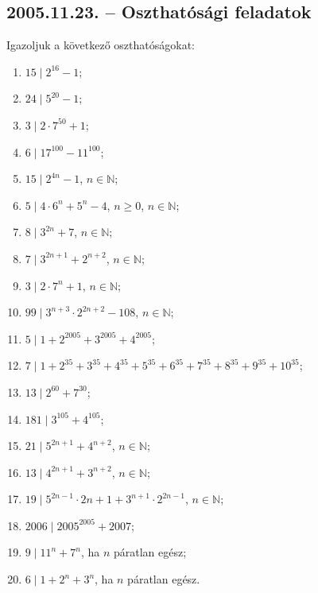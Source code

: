 \subsection*{2005.11.23. -- Oszthatósági feladatok}
Igazoljuk a következő oszthatóságokat:

\begin{enumerate}
 
\item $15 \mid 2^{16}-1$;

\item $24 \mid 5^{20}-1$;

\item $3 \mid 2 \cdot 7^{50}+1$;

\item $6 \mid 17^{100}-11^{100}$;

\item $15 \mid 2^{4n}-1$, $n \in \mathbb{N}$;

\item $5 \mid 4 \cdot 6^n+5^n-4$, $n \ge 0$, $n \in \mathbb{N}$;

\item $8 \mid 3^{2n}+7$, $n \in \mathbb{N}$;

\item $7 \mid 3^{2n+1}+2^{n+2}$, $n \in \mathbb{N}$;

\item $3 \mid 2 \cdot 7^n+1$, $n \in \mathbb{N}$;

\item $99 \mid 3^{n+3} \cdot 2^{2n+2}-108$, $n \in \mathbb{N}$;

\item $5 \mid 1+2^{2005}+3^{2005}+4^{2005}$;

\item $7 \mid 1+2^{35}+3^{35}+4^{35}+5^{35}+6^{35}+7^{35}+8^{35}+9^{35}+10^{35}$;

\item $13 \mid 2^{60}+7^{30}$;

\item $181 \mid 3^{105}+4^{105}$;

\item $21 \mid 5^{2n+1}+4^{n+2}$, $n \in \mathbb{N}$;

\item $13 \mid 4^{2n+1}+3^{n+2}$, $n \in \mathbb{N}$;

\item $19 \mid 5^{2n-1} \cdot 2{n+1}+3^{n+1} \cdot 2^{2n-1}$, $n \in \mathbb{N}$;

\item $2006 \mid 2005^{2005}+2007$;

\item $9 \mid 11^n+7^n$, ha $n$ páratlan egész;

\item $6 \mid 1+2^n+3^n$, ha $n$ páratlan egész.  
\end{enumerate}

